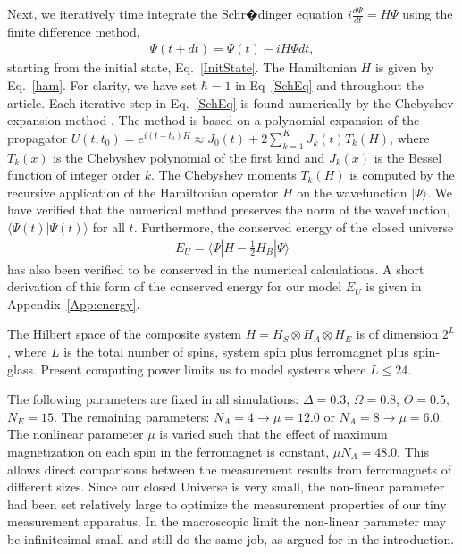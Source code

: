 \documentclass[showpacs,preprintnumbers,amsmath,amssymb,12pt]{revtex4-2}
\begin{document}
Next, we iteratively time integrate the Schr�dinger equation $i
\frac{d\Psi}{dt} = H \Psi$ using the finite difference method,
\begin{eqnarray}
  \Psi(t+dt) = \Psi(t) - i H \Psi dt,
\label{SchEq}
\end{eqnarray}
starting from the initial state, Eq.~\eqref{InitState}. The
Hamiltonian $H$ is given by Eq.~\eqref{ham}. For clarity, we have set
$\hbar=1$ in Eq~\eqref{SchEq} and throughout the article. Each
iterative step in Eq.~\eqref{SchEq} is found numerically by the
Chebyshev expansion method \cite{tal,zhang,dobrovitski}. The method is
based on a polynomial expansion of the propagator
$U(t,t_0)=e^{i(t-t_0)H}\approx J_0(t)+2\sum\limits_{k=1}^K
J_k(t)T_k(H)$, where $T_k(x)$ is the Chebyshev polynomial of the first
kind and $J_k(x)$ is the Bessel function of integer order $k$. The
Chebyshev moments $T_k(H)$ is computed by the recursive application of
the Hamiltonian operator $H$ on the wavefunction $|\Psi\rangle$.  We
have verified that the numerical method preserves the norm of the
wavefunction, $\langle \Psi(t) | \Psi(t)\rangle$ for all
$t$. Furthermore, the conserved energy of the closed universe
\begin{eqnarray}
  E_U = \langle \Psi | H - \frac{1}{2} H_B |\Psi \rangle
\label{E_tot}
\end{eqnarray}
has also been verified to be conserved in the numerical
calculations. A short derivation of this form of the conserved energy
for our model $E_U$ is given in Appendix~\ref{App:energy}.

The Hilbert space of the composite system $H =H_{S}\otimes H_{A}
\otimes H_{E}$ is of dimension $2^L$, where $L$ is the total number of
spins, system spin plus ferromagnet plus spin-glass. Present computing
power limits us to model systems where $L \le 24$.

The following parameters are fixed in all simulations: $\Delta = 0.3$,
$\Omega = 0.8$, $\Theta = 0.5$, $N_E = 15$. The remaining parameters:
$N_A = 4 \rightarrow \mu=12.0$ or $N_A = 8 \rightarrow \mu=6.0$. The
nonlinear parameter $\mu$ is varied such that the effect of maximum
magnetization on each spin in the ferromagnet is constant, $\mu
N_A=48.0$. This allows direct comparisons between the measurement
results from ferromagnets of different sizes. Since our closed
Universe is very small, the non-linear parameter had been set
relatively large to optimize the measurement properties of our tiny
measurement apparatus. In the macroscopic limit the non-linear
parameter may be infinitesimal small and still do the same job, as
argued for in the introduction.
\end{document}

